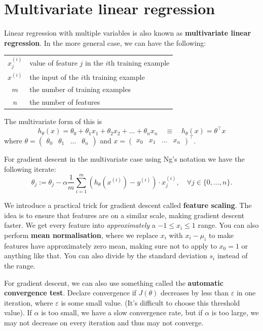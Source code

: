 \documentclass[a4paper, 10pt, oneside]{book}
\begin{document}
\section{Multivariate linear regression}

Linear regression with multiple variables is also known as \textbf{multivariate linear regression}. In the more general case, we can have the following:

\begin{center}
    \begin{tabular}{cl}
     $x_j^{(i)}$ & value of feature $j$ in the $i$th training example \\
     $x^{(i)}$ & the input of the $i$th training example \\
     $m$ & the number of training examples \\
     $n$ & the number of features
    \end{tabular}
\end{center}
The multivariate form of this is
\[h_\theta(x) = \theta_0 + \theta_1 x_1 + \theta_2 x_2 + \ldots + \theta_n x_n \quad \equiv \quad h_\theta(x) = \theta^\top x\]
where $\theta = \begin{pmatrix} \theta_0 & \theta_1 & \ldots & \theta_n \end{pmatrix}$ and $x = \begin{pmatrix} x_0 & x_1 & \ldots & x_n \end{pmatrix}^\top$.

For gradient descent in the multivariate case using Ng's notation we have the following iterate:
\[\theta_j := \theta_j - \alpha \frac1m \sum_{i=1}^m (h_\theta(x^{(i)}) - y^{(i)}) \cdot x_j^{(i)}, \quad \forall j \in \{0, \ldots, n\}.\]

We introduce a practical trick for gradient descent called \textbf{feature scaling}. The idea is to ensure that features are on a similar scale, making gradient descent faster. We get every feature into \textit{approximately} a $-1 \leq x_i \leq 1$ range. You can also perform \textbf{mean normalisation}, where we replace $x_i$ with $x_i - \mu_i$ to make features have approximately zero mean, making sure not to apply to $x_0 = 1$ or anything like that. You can also divide by the standard deviation $s_i$ instead of the range.

For gradient descent, we can also use something called the \textbf{automatic convergence test}. Declare convergence if $J(\theta)$ decreases by less than $\varepsilon$ in one iteration, where $\varepsilon$ is some small value. (It's difficult to choose this threshold value). If $\alpha$ is too small, we have a slow convergence rate, but if $\alpha$ is too large, we may not decrease on every iteration and thus may not converge.
\end{document}
